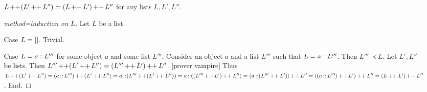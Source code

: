 \documentclass[10pt]{article}
\begin{document}
  \begin{forthel}
    \begin{proposition}[id=LISTS_CONCAT_1021563255448756,printid]
      $L \mathop{++} (L' \mathop{++} L'') = (L \mathop{++} L') \mathop{++} L''$ for any lists $L, L', L''$.
    \end{proposition}
    \begin{proof}[method=induction on $L$]
      Let $L$ be a list.

      Case $L = []$. Trivial.

      Case $L = a \mathop{::} L'''$ for some object $a$ and some list $L'''$.
        Consider an object $a$ and a list $L'''$ such that $L = a \mathop{::} L'''$.
        Then $L''' \prec L$.
        Let $L',L''$ be lists.
        Then $L''' \mathop{++} (L' \mathop{++} L'') = (L''' \mathop{++} L') \mathop{++} L''$.
        [prover vampire]
        Thus $L \mathop{++} (L' \mathop{++} L'') 
          = (a \mathop{::} L''') \mathop{++} (L' \mathop{++} L'')
          = a \mathop{::} (L''' \mathop{++} (L' \mathop{++} L''))
          = a \mathop{::} ((L''' \mathop{++} L') \mathop{++} L'')
          = (a \mathop{::} (L''' \mathop{++} L')) \mathop{++} L''
          = ((a \mathop{::} L''') \mathop{++} L') \mathop{++} L''
          = (L \mathop{++} L') \mathop{++} L''$.
      End.
    \end{proof}
  \end{forthel}
\end{document}
